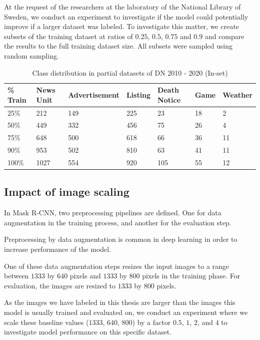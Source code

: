 \documentclass[oneside, english, bibtex]{kththesis}
\begin{document}
At the request of the researchers at the laboratory of the National Library of Sweden, we conduct an experiment to investigate if the model could potentially improve if a larger dataset was labeled. To investigate this matter, we create subsets of the training dataset at ratios of $0.25$, $0.5$, $0.75$ and $0.9$ and compare the results to the full training dataset size. All subsets were sampled using random sampling.

\begin{table}[H]
    \caption{Class distribution in partial datasets of DN 2010 - 2020 (In-set)}
    \label{tab:partialdist}
    \begin{tabular}{l|l|l|l|l|l|l} %
    \textbf{\% Train} & \textbf{News Unit} & \textbf{Advertisement} & \textbf{Listing} & \textbf{Death Notice} & \textbf{Game} & \textbf{Weather}  \\
    \hline
    25\% & 212 & 149 & 225 & 23 & 18 & 2 \\    \hline
    50\% & 449 & 332 & 456 & 75 & 26 & 4 \\    \hline
    75\% & 648 & 500 & 618 & 66 & 36 & 11 \\    \hline
    90\% & 953 & 502 & 810 & 63 & 41 & 11 \\    \hline
    100\% & 1027 & 554 & 920 & 105 & 55 & 12 \\    \hline
    \end{tabular}
\end{table}


\subsection{Impact of image scaling}

In Mask R-CNN, two preprocessing pipelines are defined. One for data augmentation in the training process, and another for the evaluation step.

Preprocessing by data augmentation is common in deep learning in order to increase performance of the model.

One of these data augmentation steps resizes the input images to a range between $1333$ by $640$ pixels and $1333$ by $800$ pixels in the training phase. For evaluation, the images are resized to $1333$ by $800$ pixels.

As the images we have labeled in this thesis are larger than the images this model is usually trained and evaluated on,
we conduct an experiment where we scale these baseline values ($1333$, $640$, $800$) by a factor $0.5$, $1$, $2$, and $4$ to investigate model performance on this specific dataset.
\end{document}
